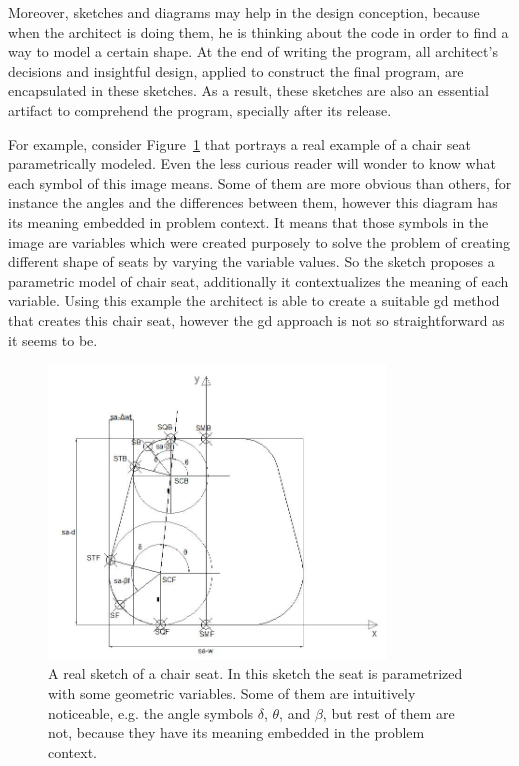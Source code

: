 Moreover, sketches and diagrams may help in the design conception, because when the architect is doing them, he is thinking about the code in order to find a way to model a certain shape. At the end of writing the program, all architect's decisions and insightful design, applied to construct the final program, are encapsulated in these sketches. As a result, these sketches are also an essential artifact to comprehend the program, specially after its release. 

For example, consider Figure~\ref{fig:chairseat} that portrays a real example of a chair seat parametrically modeled. Even the less curious reader will wonder to know what each symbol of this image means. Some of them are more obvious than others, for instance the angles and the differences between them, however this diagram has its meaning embedded in problem context. It means that those symbols in the image are variables which were created purposely to solve the problem of creating different shape of seats by varying the variable values. So the sketch proposes a parametric model of chair seat, additionally it contextualizes the meaning of each variable. Using this example the architect is able to create a suitable \gls{gd} method that creates this chair seat, however the \gls{gd} approach is not so straightforward as it seems to be. 

\begin{figure}[!htbp]
  \centering
  \includegraphics[width=0.8\textwidth]{images/seat}
    \caption{A real sketch of a chair seat. In this sketch the seat is parametrized with some geometric variables. Some of them are intuitively noticeable, e.g. the angle symbols $\delta$, $\theta$, and $\beta$, but rest of them are not, because they have its meaning embedded in the problem context.}
  \label{fig:chairseat}
\end{figure}

